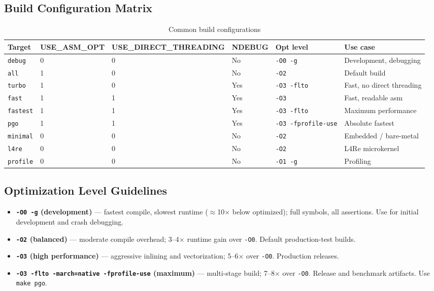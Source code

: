 \subsection{Build Configuration Matrix}
\label{sec:build-matrix}

\begin{table}[h]
\centering
\caption{Common build configurations}
\label{tab:build-matrix}
\begin{tabular}{llllll}
\toprule
Target & USE\_ASM\_OPT & USE\_DIRECT\_THREADING & NDEBUG & Opt level & Use case \\
\midrule
\texttt{debug}   & 0 & 0 & No  & \texttt{-O0 -g}          & Development, debugging \\
\texttt{all}     & 1 & 0 & No  & \texttt{-O2}             & Default build \\
\texttt{turbo}   & 1 & 0 & Yes & \texttt{-O3 -flto}       & Fast, no direct threading \\
\texttt{fast}    & 1 & 1 & Yes & \texttt{-O3}             & Fast, readable asm \\
\texttt{fastest} & 1 & 1 & Yes & \texttt{-O3 -flto}       & Maximum performance \\
\texttt{pgo}     & 1 & 1 & Yes & \texttt{-O3 -fprofile-use} & Absolute fastest \\
\texttt{minimal} & 0 & 0 & No  & \texttt{-O2}             & Embedded / bare-metal \\
\texttt{l4re}    & 0 & 0 & No  & \texttt{-O2}             & L4Re microkernel \\
\texttt{profile} & 0 & 0 & No  & \texttt{-O1 -g}          & Profiling \\
\bottomrule
\end{tabular}
\end{table}

\subsection{Optimization Level Guidelines}
\label{sec:build-optlevels}

\begin{itemize}
  \item \textbf{\texttt{-O0 -g} (development)} — fastest compile, slowest runtime (\(\approx\)10\(\times\) below optimized); full symbols, all assertions. Use for initial development and crash debugging.
  \item \textbf{\texttt{-O2} (balanced)} — moderate compile overhead; 3--4\(\times\) runtime gain over \texttt{-O0}. Default production-test builds.
  \item \textbf{\texttt{-O3} (high performance)} — aggressive inlining and vectorization; 5--6\(\times\) over \texttt{-O0}. Production releases.
  \item \textbf{\texttt{-O3 -flto -march=native -fprofile-use} (maximum)} — multi-stage build; 7--8\(\times\) over \texttt{-O0}. Release and benchmark artifacts. Use \texttt{make pgo}.
\end{itemize}

